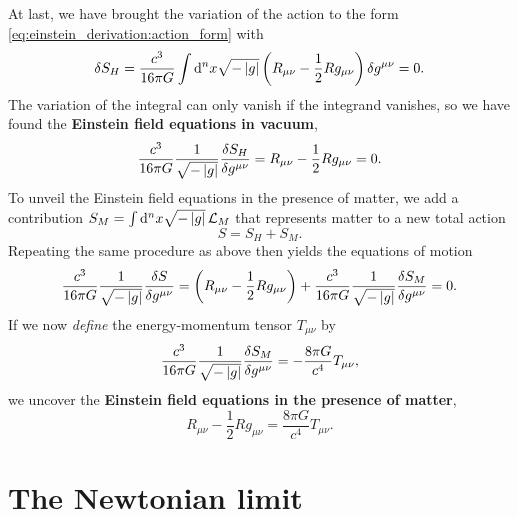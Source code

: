 At last, we have brought the variation of the action to the form \eqref{eq:einstein_derivation:action_form} with
\begin{equation}
	\delta S_H = \frac{c^3}{16 \pi G} \int \mathop{}\!\mathrm{d}^n x \sqrt{-\left\lvert g \right\rvert} \left( R_{\mu \nu} - \frac{1}{2} R g_{\mu \nu} \right) \delta g^{\mu \nu} = 0 .
\end{equation}
The variation of the integral can only vanish if the integrand vanishes, so we have found the \textbf{Einstein field equations in vacuum},
\begin{equation}
	 \frac{c^3}{16 \pi G} \frac{1}{\sqrt{-\det{g}}} \fdv{S_H}{g^{\mu \nu}} = R_{\mu \nu} - \frac{1}{2} R g_{\mu \nu} = 0 .
	\label{eq:einstein_derivation:einstein_vacuum}
\end{equation}
To unveil the Einstein field equations in the presence of matter, we add a contribution $S_M = \int \mathop{}\!\mathrm{d}^n x \sqrt{-\left\lvert g \right\rvert} \, \mathcal{L}_M$ that represents matter to a new total action
\begin{equation}
	S = S_H + S_M .
\end{equation}
Repeating the same procedure as above then yields the equations of motion
\begin{equation}
	\frac{c^3}{16 \pi G} \frac{1}{\sqrt{-\det{g}}} \fdv{S}{g^{\mu \nu}} = \left( R_{\mu \nu} - \frac{1}{2} R g_{\mu \nu} \right) + \frac{c^3}{16 \pi G} \frac{1}{\sqrt{-\det{g}}} \frac{\variation{S_M}}{\variation{g^{\mu \nu}}} = 0 .
\end{equation}
If we now \emph{define} the energy-momentum tensor $T_{\mu \nu}$ by
\begin{equation}
	\frac{c^3}{16 \pi G} \frac{1}{\sqrt{-\left\lvert g \right\rvert}} \frac{\delta S_M}{\delta g^{\mu \nu}} = -\frac{8 \pi G}{c^4} T_{\mu \nu} ,
\end{equation}
we uncover the \textbf{Einstein field equations in the presence of matter},
\begin{equation}
	R_{\mu \nu} - \frac{1}{2} R g_{\mu \nu} = \frac{8 \pi G}{c^4} T_{\mu \nu} .
	\label{eq:einstein_derivation:einstein_matter}
\end{equation}

\section{The Newtonian limit}
\label{sec:weak_field_limit}


